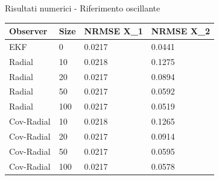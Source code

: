 \documentclass{beamer}
\begin{document}
\begin{frame}{Risultati numerici - Riferimento oscillante}
    \begin{table}[]
        \begin{tabular}{|llll|}
        \hline
        \textbf{Observer} & \textbf{Size} & \textbf{NRMSE X\_1} & \textbf{NRMSE X\_2} \\    \hline
        EKF         &   0   &   0.0217  &   0.0441  \\  \hline
        Radial      &   10  &   0.0218  &   0.1275  \\
        Radial      &   20  &   0.0217  &   0.0894  \\
        Radial      &   50  &   0.0217  &   0.0592  \\
        Radial      &   100 &   0.0217  &   0.0519  \\  \hline
        Cov-Radial  &   10  &   0.0218  &   0.1265  \\
        Cov-Radial  &   20  &   0.0217  &   0.0914  \\
        Cov-Radial  &   50  &   0.0217  &   0.0595  \\
        Cov-Radial  &   100 &   0.0217  &   0.0578  \\ \hline
        \end{tabular}
        \end{table}
\end{frame}
\end{document}
